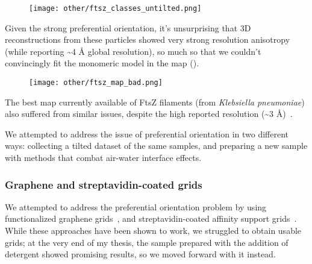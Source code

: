 \begin{figure}[!ht]
    \centering
    \texttt{[image: other/ftsz\_classes\_untilted.png]}
    \label{fig:ftsz_classes}
\end{figure}

Given the strong preferential orientation, it's unsurprising that 3D reconstructions from these particles showed very strong resolution anisotropy (while reporting \sim4 Å global resolution), so much so that we couldn't convincingly fit the monomeric model in the map ().

\begin{figure}[!ht]
    \centering
    \texttt{[image: other/ftsz\_map\_bad.png]}
    \label{fig:ftsz_map_bad}
\end{figure}

The best map currently available of FtsZ filaments (from \textit{Klebsiella pneumoniae}) also suffered from similar issues, despite the high reported resolution (\sim3 Å)~\cite{fujitaStructuresFtsZSingle2023}.

We attempted to address the issue of preferential orientation in two different ways: collecting a tilted dataset of the same samples, and preparing a new sample with methods that combat air-water interface effects.

\subsubsection{Graphene and streptavidin-coated grids}

We attempted to address the preferential orientation problem by using functionalized graphene grids~\cite{luFunctionalizedGrapheneGrids2022}, and streptavidin-coated affinity support grids~\cite{crucifixImmobilizationBiotinylatedDNA2004,hanLongShelflifeStreptavidin2016}.
While these approaches have been shown to work, we struggled to obtain usable grids; at the very end of my thesis, the sample prepared with the addition of detergent showed promising results, so we moved forward with it instead.


